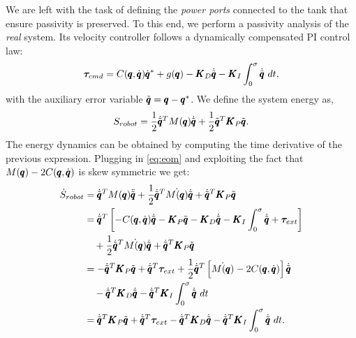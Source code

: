 
We are left with the task of defining the \emph{power ports} connected to the tank that ensure passivity is preserved. To this end, we perform a passivity analysis of the \emph{real} system. Its 
velocity controller follows a dynamically compensated PI control law:
\begin{equation}
\boldsymbol{\tau}_{cmd} = C(\pmb{q}, \dot{\pmb{q}}) \dot{\pmb{q}}^* + g(\pmb{q}) - \pmb{K}_D \dot{\tilde{\pmb{q}}} - \pmb{K}_I \int_{0}^{\sigma} \dot{\tilde{\pmb{q}}}\ dt,
\end{equation}
with the auxiliary error variable $\tilde{\pmb{q}} =  \pmb{q} - \pmb{q}^*$. We define the system energy as, 
\begin{equation}
    S_{robot} = \frac{1}{2} \dot{\tilde{\pmb{q}}}^T M(\pmb{q}) \dot{\tilde{\pmb{q}}} + \frac{1}{2} \tilde{\pmb{q}}^T \pmb{K}_P \tilde{\pmb{q}}.
\end{equation}
The energy dynamics can be obtained by computing the time derivative of the previous expression. Plugging in \eqn \eqref{eq:eom} and exploiting the fact that $M(\pmb{q}) - 2 C(\pmb{q}, \dot{\pmb{q}})$ is skew symmetric we get:
\begin{equation*}
\begin{aligned}
    \dot{S}_{robot} &= \dconfigRobotError^T \massMatrix \ddconfigRobotError + \frac{1}{2} \dconfigRobotError^T \dot{\massMatrix} \dconfigRobotError + \dconfigRobotError^T \matr{K}_P \configRobotError \\
    &= \dconfigRobotError^T \left[ -\coriolis \dconfigRobotError - \matr{K}_P \configRobotError - \matr{K}_D \dconfigRobotError - \matr{K}_I \int_{0}^{\sigma} \dconfigRobotError + \externalTorque \right] \\
    &\quad + \frac{1}{2} \dconfigRobotError^T \dot{\massMatrix} \dconfigRobotError + \dconfigRobotError^T \matr{K}_P \configRobotError \\
    &= -\dconfigRobotError^T \matr{K}_P \configRobotError + \dconfigRobotError^T \externalTorque + \frac{1}{2} \dconfigRobotError^T\left[ \dot{\massMatrix} - 2\coriolis \right] \dconfigRobotError \\
    &\quad - \dconfigRobotError^T \matr{K}_D \dconfigRobotError  - \dconfigRobotError^T \matr{K}_I \int^{\sigma}_{0} \dconfigRobotError\ dt\\
    &= \dconfigRobotError^T \matr{K}_P \configRobotError + \dconfigRobotError^T \externalTorque - \dconfigRobotError^T \matr{K}_D \dconfigRobotError -  \dconfigRobotError^T \matr{K}_I \int^{\sigma}_{0} \dconfigRobotError\ dt.  
\end{aligned}
\end{equation*}
